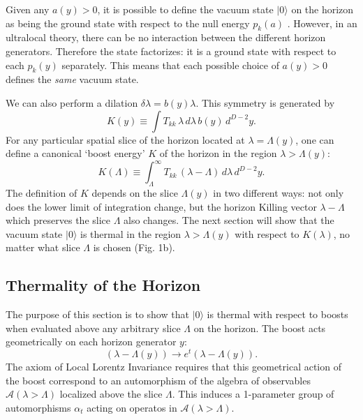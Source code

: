 \documentclass{article}
\begin{document}
Given any $a(y) > 0$, it is possible to define the vacuum state $|0\rangle$ on the horizon as being the ground state with respect to the null energy $p_k(a)$ \cite{sewell82}.  However, in an ultralocal theory, there can be no interaction between the different horizon generators.  Therefore the state factorizes: it is a ground state with respect to each $p_k(y)$ separately.  This means that each possible choice of $a(y) > 0$ defines the \emph{same} vacuum state.

We can also perform a dilation $\delta \lambda = b(y)\lambda$.  This symmetry is generated by
\begin{equation}
K(y) \equiv \int T_{kk}\,\lambda\,d\lambda\,b(y)\,d^{D-2}y.
\end{equation}
For any particular spatial slice of the horizon located at $\lambda = \Lambda(y)$, one can define a canonical `boost energy' $K$ of the horizon in the region $\lambda > \Lambda(y)$:
\begin{equation}\label{modular}
K(\Lambda) \equiv \int_\Lambda^\infty T_{kk}\,(\lambda - \Lambda) \,d\lambda\,d^{D-2}y.
\end{equation}
The definition of $K$ depends on the slice $\Lambda(y)$ in two different ways: not only does the lower limit of integration change, but the horizon Killing vector $\lambda - \Lambda$ which preserves the slice $\Lambda$ also changes.  The next section will show that the vacuum state $|0\rangle$ is thermal in the region $\lambda > \Lambda(y)$ with respect to $K(\lambda)$, no matter what slice $\Lambda$ is chosen (Fig. 1b).

\subsection{Thermality of the Horizon}\label{thermal}

The purpose of this section is to show that $|0\rangle$ is thermal with respect to boosts when evaluated above any arbitrary slice $\Lambda$ on the horizon.  The boost acts geometrically on each horizon generator $y$:
\begin{equation}
(\lambda - \Lambda(y)) \to e^{t} (\lambda - \Lambda(y)).
\end{equation}
The axiom of Local Lorentz Invariance requires that this geometrical action of the boost correspond to an automorphism of the algebra of observables $\mathcal{A}(\lambda > \Lambda)$ localized above the slice $\Lambda$.  This induces a 1-parameter group of automorphisms $\alpha_t$ acting on operatos in $\mathcal{A}(\lambda > \Lambda)$.
\end{document}
